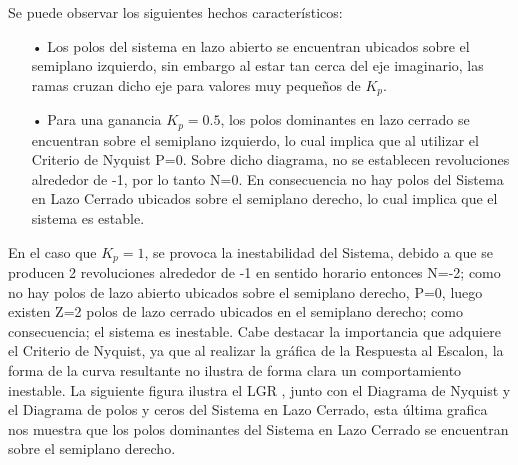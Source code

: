 \documentclass[12pt,letterpaper]{article}
\begin{document}
\begin{figure}[H]
\centering
{}
\end{figure}

Se puede observar los siguientes hechos característicos:
\begin{enumerate}
\item[•] Los polos del sistema en lazo abierto se encuentran ubicados sobre el semiplano izquierdo, sin embargo al estar tan cerca del eje imaginario, las ramas cruzan dicho eje para valores muy pequeños de $K_{p}$.
\item[•] Para una ganancia $K_{p}=0.5$, los polos dominantes en lazo cerrado se encuentran sobre el semiplano izquierdo, lo cual implica que al utilizar el Criterio de Nyquist P=0. Sobre dicho diagrama, no se establecen revoluciones alrededor de -1, por lo tanto N=0. En consecuencia no hay polos del Sistema en Lazo Cerrado ubicados sobre el semiplano derecho, lo cual implica que el sistema es estable.

\end{enumerate} 

En el caso que $K_{p}=1$, se provoca la inestabilidad del Sistema, debido a que se producen 2 revoluciones alrededor de -1 en sentido horario entonces N=-2; como no hay polos de lazo abierto ubicados sobre el semiplano derecho, P=0, luego existen Z=2 polos de lazo cerrado ubicados en el semiplano derecho; como consecuencia; el sistema es inestable. Cabe destacar la importancia que adquiere el Criterio de Nyquist, ya que al realizar la gráfica de la Respuesta al Escalon, la forma de la curva resultante no ilustra de forma clara un comportamiento inestable. La siguiente figura ilustra el LGR , junto con el Diagrama de Nyquist y el Diagrama de polos y ceros del Sistema en Lazo Cerrado, esta última grafica nos muestra que los polos dominantes del Sistema en Lazo Cerrado se encuentran sobre el semiplano derecho.
\end{document}
